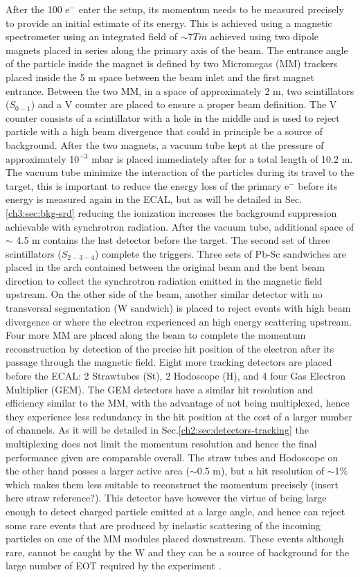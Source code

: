 After the 100 \gev e$^-$ enter the setup, its momentum needs to be measured precisely to provide an initial estimate of its energy. This is achieved using a magnetic spectrometer using an integrated field of $\sim 7 T \dot m$ achieved using two dipole magnets \cite{mbpl} placed in series along the primary axis of the beam. The entrance angle of the particle inside the magnet is defined by two Micromegas (MM) trackers placed inside the 5 m space between the beam inlet and the first magnet entrance. Between the two MM, in a space of approximately 2 m, two scintillators ($S_{0-1}$) and a V counter are placed to ensure a proper beam definition. The V counter consists of a scintillator with a hole in the middle and is used to reject particle with a high beam divergence that could in principle be a source of background. After the two magnets, a vacuum tube kept at the pressure of approximately 10$^{-3}$ \si{mbar} is placed immediately after for a total length of 10.2 \si{m}. The vacuum tube minimize the interaction of the particles during its travel to the target, this is important to reduce the energy loss of the primary e$^-$ before its energy is measured again in the ECAL, but as will be detailed in Sec.\ref{ch3:sec:bkg-srd} reducing the ionization increases the background suppression achievable with synchrotron radiation. After the vacuum tube, additional space of $\sim$ 4.5 \si{m} contains the last detector before the target. The second set of three scintillators ($S_{2-3-4}$) complete the triggers. Three sets of Pb-Sc sandwiches are placed in the arch contained between the original beam and the bent beam direction to collect the synchrotron radiation emitted in the magnetic field upstream. On the other side of the beam, another similar detector with no transversal segmentation (W sandwich) is placed to reject events with high beam divergence or where the electron experienced an high energy scattering upstream. Four more MM are placed along the beam to complete the momentum reconstruction by detection of the precise hit position of the electron after its passage through the magnetic field. Eight more tracking detectors are placed before the ECAL: 2 Strawtubes (St), 2 Hodoscope (H), and 4 four Gas Electron Multiplier (GEM). The GEM detectors have a similar hit resolution and efficiency similar to the MM, with the advantage of not being multiplexed, hence they experience less redundancy in the hit position at the cost of a larger number of channels. As it will be detailed in Sec.\ref{ch2:sec:detectors-tracking} the multiplexing does not limit the momentum resolution and hence the final performance given are comparable overall. The straw tubes and Hodoscope on the other hand posses a larger active area ($\sim$0.5 m), but a hit resolution of $\sim$1\% which makes them less suitable to reconstruct the momentum precisely (insert here straw reference?). This detector have however the virtue of being large enough to detect charged particle emitted at a large angle, and hence can reject some rare events that are produced by inelastic scattering of the incoming particles on one of the MM modules placed downstream. These events although rare, cannot be caught by the W and they can be a source of background for the large number of EOT required by the experiment \cite{na64-prd}. 

